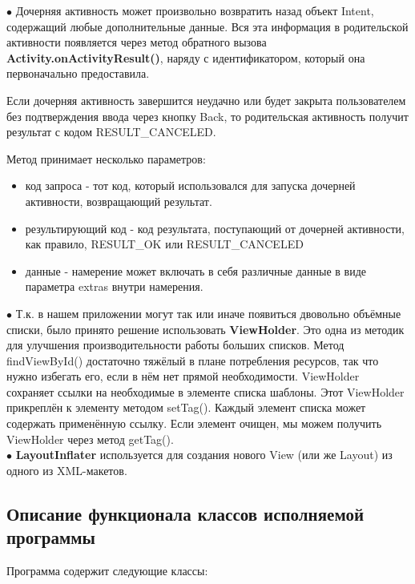 \documentclass[utf8,14pt,a4paper,oneside,russian]{book}
\begin{document}
	$\bullet$ Дочерняя активность может произвольно возвратить назад объект Intent, содержащий любые дополнительные данные. Вся эта информация в родительской активности появляется через метод обратного вызова\\ \textbf{Activity.onActivityResult()}, наряду с идентификатором, который она первоначально предоставила.
	
	Если дочерняя активность завершится неудачно или будет закрыта пользователем без подтверждения ввода через кнопку Back, то родительская активность получит результат с кодом RESULT\_CANCELED.
	
	Метод принимает несколько параметров:
	
	\begin{itemize}
	\item код запроса - тот код, который использовался для запуска дочерней активности, возвращающий результат.
	
	\item результирующий код - код результата, поступающий от дочерней активности, как правило, RESULT\_OK или RESULT\_CANCELED
	\item данные - намерение может включать в себя различные данные в виде параметра extras внутри намерения.\\
	\end{itemize}

	$\bullet$ Т.к. в нашем приложении могут так или иначе появиться двовольно объёмные списки, было принято решение использовать \textbf{ViewHolder}. Это одна из методик для улучшения производительности работы больших списков. Метод findViewById() достаточно тяжёлый в плане потребления ресурсов, так что нужно избегать его, если в нём нет прямой необходимости. ViewHolder сохраняет ссылки на необходимые в элементе списка шаблоны. Этот ViewHolder прикреплён к элементу методом setTag(). Каждый элемент списка может содержать применённую ссылку. Если элемент очищен, мы можем получить ViewHolder через метод getTag().\\
	
	$\bullet$ \textbf{LayoutInflater} используется для создания нового View (или же Layout) из одного из XML-макетов.\\
	
	\subsection{Описание функционала классов исполняемой программы}
	
	Программа содержит следующие классы:
	
\end{document}
